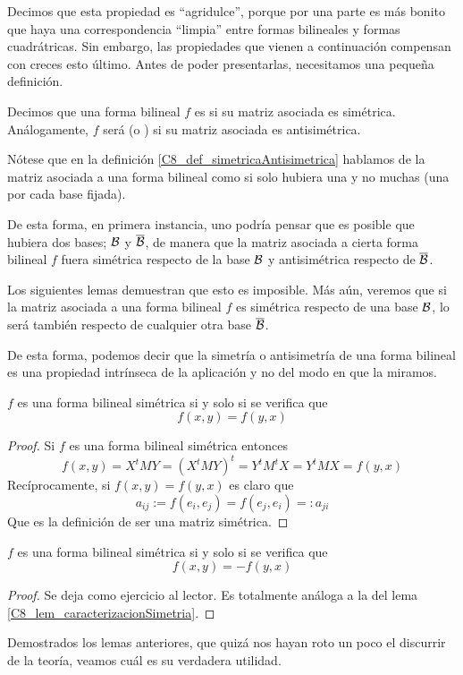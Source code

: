 Decimos que esta propiedad es ``agridulce'', porque por una parte es más bonito que haya una correspondencia ``limpia'' entre formas bilineales y formas cuadrátricas. Sin embargo, las propiedades que vienen a continuación compensan con creces esto último. Antes de poder presentarlas, necesitamos una pequeña definición.
\begin{defi}
	\label{C8_def_simetricaAntisimetrica}
	Decimos que una forma bilineal $f$ es  si su matriz asociada es simétrica. Análogamente, $f$ será  (o ) si su matriz asociada es antisimétrica.
\end{defi}
Nótese que en la definición \ref{C8_def_simetricaAntisimetrica} hablamos de la matriz asociada a una forma bilineal como si solo hubiera una y no muchas (una por cada base fijada).

De esta forma, en primera instancia, uno podría pensar que es posible que hubiera dos bases; $\mathcal{B}$ y $\overline{\mathcal{B}}$, de manera que la matriz asociada a cierta forma bilineal $f$ fuera simétrica respecto de la base $\mathcal{B}$ y antisimétrica respecto de $\overline{\mathcal{B}}$.

Los siguientes lemas demuestran que esto es imposible. Más aún, veremos que  si la matriz asociada a una forma bilineal $f$ es simétrica respecto de una base $\mathcal{B}$, lo será también respecto de cualquier otra base $\overline{\mathcal{B}}$.

De esta forma, podemos decir que la simetría o antisimetría de una forma bilineal es una propiedad intrínseca de la aplicación y no del modo en que la miramos.
\begin{lem}
	\label{C8_lem_caracterizacionSimetria}
	$f$ es una forma bilineal simétrica si y solo si se verifica que \[f(x,y)=f(y,x)\]
\end{lem}
\begin{proof}
	Si $f$ es una forma bilineal simétrica entonces \[f(x,y)=X^tMY=(X^tMY)^t=Y^tM^tX=Y^tMX=f(y,x)\]
	Recíprocamente, si $f(x,y)=f(y,x)$ es claro que \[a_{ij}:=f(e_i,e_j)=f(e_j,e_i)=:a_{ji}\]
	Que es la definición de ser una matriz simétrica.
\end{proof}
\begin{lem}
	$f$ es una forma bilineal simétrica si y solo si se verifica que \[f(x,y)=-f(y,x)\]
\end{lem}
\begin{proof}
	Se deja como ejercicio al lector. Es totalmente análoga a la del lema \ref{C8_lem_caracterizacionSimetria}. 
\end{proof}
Demostrados los lemas anteriores, que quizá nos hayan roto un poco el discurrir de la teoría, veamos cuál es su verdadera utilidad.

